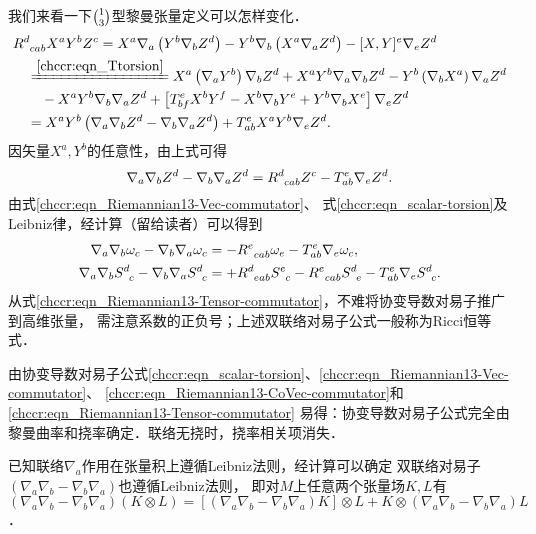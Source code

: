 我们来看一下$\binom{1}{3}$型黎曼张量定义可以怎样变化．
\begin{align*}
    &R_{\hphantom{a} cab}^d{X^a}{Y^b}{Z^c} = {X^a}{\nabla _a}\left( {{Y^b}{\nabla _b}{Z^d}} \right) -
    {Y^b}{\nabla _b}\left( {{X^a}{\nabla _a}{Z^d}} \right) - {[X,Y]^e}{\nabla _e}{Z^d} \\
    &\quad \xlongequal{\eqref{chccr:eqn_Ttorsion}} {X^a}\left( {{\nabla _a}{Y^b}} \right){\nabla _b}{Z^d}
    + {X^a}{Y^b}{\nabla _a}{\nabla _b}{Z^d}
    - {Y^b}\left( {{\nabla _b}{X^a}} \right){\nabla _a}{Z^d}  \\
    &\qquad - {X^a}{Y^b}{\nabla _b}{\nabla _a}{Z^d} + \left[ {T_{bf}^e{X^b}{Y^f}
         - {X^b}{\nabla _b}{Y^e} + {Y^b}{\nabla _b}{X^e}} \right]{\nabla _e}{Z^d} \\
    &\quad = {X^a}{Y^b}\left( {{\nabla _a}{\nabla _b}{Z^d} - {\nabla _b}{\nabla _a}{Z^d}} \right)
    + T_{ab}^e{X^a}{Y^b}{\nabla _e}{Z^d} .
\end{align*}
因矢量$X^a,Y^b$的任意性，由上式可得
\begin{equation}\label{chccr:eqn_Riemannian13-Vec-commutator}
    \nabla_a \nabla_b Z^d - \nabla_b \nabla_a Z^d = R_{\hphantom{a} cab}^d Z^c - T_{ab}^e \nabla_e Z^d .
\end{equation}
由式\eqref{chccr:eqn_Riemannian13-Vec-commutator}、
式\eqref{chccr:eqn_scalar-torsion}及Leibniz律，经计算（留给读者）可以得到
\begin{align}
    {\nabla_a}{\nabla_b}{\omega_c} - {\nabla_b}{\nabla_a}{\omega_c} &= -R_{\hphantom{a} cab}^e{\omega _e}
    - T_{ab}^e{\nabla _e}{\omega _c},  \label{chccr:eqn_Riemannian13-CoVec-commutator} \\
    {\nabla _a}{\nabla _b}S_{ \hphantom{a} c}^d - {\nabla _b}{\nabla _a}S_{ \hphantom{a} c}^d &= 
    +R_{\hphantom{a} eab}^d S_{ \hphantom{a} c}^e
    - R_{\hphantom{a} cab}^eS_{ \hphantom{a} e}^d - T_{ab}^e{\nabla _e}S_{ \hphantom{a} c}^d . 
    \label{chccr:eqn_Riemannian13-Tensor-commutator}
\end{align}
从式\eqref{chccr:eqn_Riemannian13-Tensor-commutator}，不难将协变导数对易子推广到高维张量，
需注意系数的正负号；上述双联络对易子公式一般称为Ricci恒等式．
\begin{remark}
    由协变导数对易子公式\eqref{chccr:eqn_scalar-torsion}、\eqref{chccr:eqn_Riemannian13-Vec-commutator}、
    \eqref{chccr:eqn_Riemannian13-CoVec-commutator}和\eqref{chccr:eqn_Riemannian13-Tensor-commutator}
    易得：协变导数对易子公式完全由黎曼曲率和挠率确定．联络无挠时，挠率相关项消失．
\end{remark}
\begin{remark}\label{chccr:rek_DD}
    已知联络$\nabla_a$作用在张量积上遵循Leibniz法则，经计算可以确定
    双联络对易子$(\nabla_a \nabla_b - \nabla_b \nabla_a)$也遵循Leibniz法则，
    即对$M$上任意两个张量场$K,L$有
    $(\nabla_a \nabla_b - \nabla_b \nabla_a)(K\otimes L)
    =[(\nabla_a \nabla_b - \nabla_b \nabla_a) K]\otimes  L+
    K\otimes (\nabla_a \nabla_b - \nabla_b \nabla_a) L$．
\end{remark}

